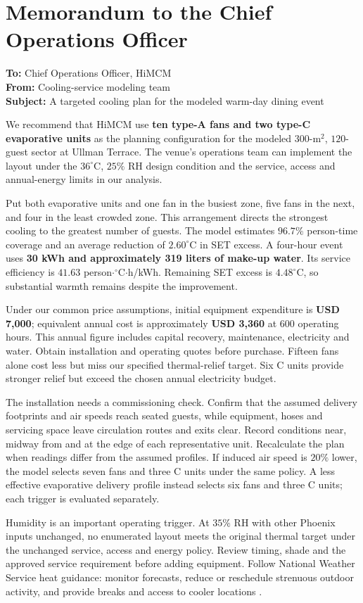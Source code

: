 \clearpage
\section*{Memorandum to the Chief Operations Officer}
\noindent\textbf{To:} Chief Operations Officer, HiMCM\\
\textbf{From:} Cooling-service modeling team\\
\textbf{Subject:} A targeted cooling plan for the modeled warm-day dining event

We recommend that HiMCM use \textbf{ten type-A fans and two type-C evaporative units} as the planning configuration for the modeled $300$-m$^2$, $120$-guest sector at Ullman Terrace. The venue's operations team can implement the layout under the $36^\circ$C, $25\%$ RH design condition and the service, access and annual-energy limits in our analysis.

Put both evaporative units and one fan in the busiest zone, five fans in the next, and four in the least crowded zone. This arrangement directs the strongest cooling to the greatest number of guests. The model estimates $96.7\%$ person-time coverage and an average reduction of $2.60^\circ$C in SET excess. A four-hour event uses \textbf{30 kWh and approximately 319 liters of make-up water}. Its service efficiency is $41.63$ person$\cdot{}^\circ$C$\cdot$h/kWh. Remaining SET excess is $4.48^\circ$C, so substantial warmth remains despite the improvement.

Under our common price assumptions, initial equipment expenditure is \textbf{USD 7,000}; equivalent annual cost is approximately \textbf{USD 3,360} at 600 operating hours. This annual figure includes capital recovery, maintenance, electricity and water. Obtain installation and operating quotes before purchase. Fifteen fans alone cost less but miss our specified thermal-relief target. Six C units provide stronger relief but exceed the chosen annual electricity budget.

The installation needs a commissioning check. Confirm that the assumed delivery footprints and air speeds reach seated guests, while equipment, hoses and servicing space leave circulation routes and exits clear. Record conditions near, midway from and at the edge of each representative unit. Recalculate the plan when readings differ from the assumed profiles. If induced air speed is $20\%$ lower, the model selects seven fans and three C units under the same policy. A less effective evaporative delivery profile instead selects six fans and three C units; each trigger is evaluated separately.

Humidity is an important operating trigger. At $35\%$ RH with other Phoenix inputs unchanged, no enumerated layout meets the original thermal target under the unchanged service, access and energy policy. Review timing, shade and the approved service requirement before adding equipment. Follow National Weather Service heat guidance: monitor forecasts, reduce or reschedule strenuous outdoor activity, and provide breaks and access to cooler locations \cite{nws-heat}.


